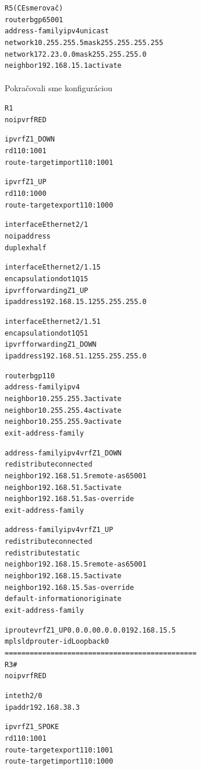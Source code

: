 \documentclass[12pt,twoside,a4paper]{report}
\begin{document}
\noindent
{\selectfont
\begin{small}
\begin{alltt}
R5 (CE smerovač)
router bgp 65001
  address-family ipv4 unicast
    network 10.255.255.5 mask 255.255.255.255
    network 172.23.0.0 mask 255.255.255.0
    neighbor 192.168.15.1 activate
\end{alltt}
\end{small}
}

\paragraph{}
Pokračovali sme konfiguráciou 

\noindent
{\selectfont
\begin{small}
\begin{alltt}
R1
no ip vrf RED

ip vrf Z1_DOWN
 rd 110:1001
 route-target import 110:1001

ip vrf Z1_UP
 rd 110:1000
 route-target export 110:1000

interface Ethernet2/1
 no ip address
 duplex half

interface Ethernet2/1.15
 encapsulation dot1Q 15
 ip vrf forwarding Z1_UP
 ip address 192.168.15.1 255.255.255.0

interface Ethernet2/1.51
 encapsulation dot1Q 51
 ip vrf forwarding Z1_DOWN
 ip address 192.168.51.1 255.255.255.0

router bgp 110
 address-family ipv4
  neighbor 10.255.255.3 activate
  neighbor 10.255.255.4 activate
  neighbor 10.255.255.9 activate
 exit-address-family
 
 address-family ipv4 vrf Z1_DOWN
  redistribute connected
  neighbor 192.168.51.5 remote-as 65001
  neighbor 192.168.51.5 activate
  neighbor 192.168.51.5 as-override
 exit-address-family
 
 address-family ipv4 vrf Z1_UP
  redistribute connected
  redistribute static
  neighbor 192.168.15.5 remote-as 65001
  neighbor 192.168.15.5 activate
  neighbor 192.168.15.5 as-override
  default-information originate
 exit-address-family

ip route vrf Z1_UP 0.0.0.0 0.0.0.0 192.168.15.5
mpls ldp router-id Loopback0
==============================================
R3#
no ip vrf RED

int eth2/0
 ip addr 192.168.38.3

ip vrf Z1_SPOKE
 rd 110:1001
 route-target export 110:1001
 route-target import 110:1000


\end{alltt}
\end{small}}
\end{document}

